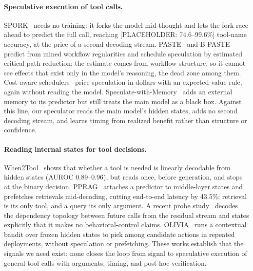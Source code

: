 \documentclass[11pt]{article}
\begin{document}
\paragraph{Speculative execution of tool calls.}
SPORK~\citep{spork2026} needs no training: it forks the model mid-thought and
lets the fork race ahead to predict the full call, reaching
[PLACEHOLDER: 74.6--99.6\%] tool-name accuracy, at the price of a second
decoding stream. PASTE~\citep{paste2026} and B-PASTE~\citep{bpaste2026}
predict from mined workflow regularities and schedule speculation by
estimated critical-path reduction; the estimate comes from workflow
structure, so it cannot see effects that exist only in the model's reasoning,
the dead zone among them. Cost-aware schedulers~\citep{costaware2026} price
speculation in dollars with an expected-value rule, again without reading the
model. Speculate-with-Memory~\citep{swm2026} adds an external memory to its
predictor but still treats the main model as a black box. Against this line,
our speculator reads the main model's hidden states, adds no second decoding
stream, and learns timing from realized benefit rather than structure or
confidence.

\paragraph{Reading internal states for tool decisions.}
When2Tool~\citep{when2tool2026} shows that whether a tool is needed is
linearly decodable from hidden states (AUROC 0.89--0.96), but reads once,
before generation, and stops at the binary decision.
PPRAG~\citep{pprag2026} attaches a predictor to middle-layer states and
prefetches retrievals mid-decoding, cutting end-to-end latency by 43.5\%;
retrieval is its only tool, and a query its only argument. A recent probe
study~\citep{depgraph2026} decodes the dependency topology between future
calls from the residual stream and states explicitly that it makes no
behavioral-control claims. OLIVIA~\citep{olivia2026} runs a contextual bandit
over frozen hidden states to pick among candidate actions in repeated
deployments, without speculation or prefetching. These works establish that
the signals we need exist; none closes the loop from signal to speculative
execution of general tool calls with arguments, timing, and post-hoc
verification.
\end{document}

